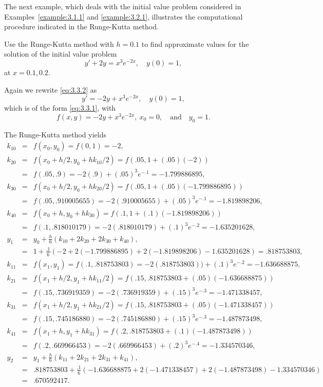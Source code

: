 \documentclass{ximera}
\begin{document}
 The next example, which deals with the initial value problem
considered in Examples~\ref{example:3.1.1} and \ref{example:3.2.1},
illustrates
the computational procedure indicated in the Runge-Kutta method.

\begin{example}\label{example:3.3.1}
Use the Runge-Kutta method with $h=0.1$ to find approximate values for
the solution of the initial value problem
\begin{equation}\label{eq:3.3.2}
y'+2y=x^3e^{-2x},\quad y(0)=1,
\end{equation}
at $x=0.1,0.2$.


\begin{explanation}
Again we rewrite \eqref{eq:3.3.2}  as
$$
y'=-2y+x^3e^{-2x},\quad y(0)=1,
$$
which is of the form \eqref{eq:3.3.1}, with
$$
f(x,y)=-2y+x^3e^{-2x},\ x_0=0,\quad\mbox{and}\quad y_0=1.
$$

The Runge-Kutta method yields
\begin{eqnarray*}
k_{10} & = & f(x_0,y_0)
  = f(0,1)=-2,\\
k_{20} & = & f(x_0+h/2,y_0+hk_{10}/2)=f(.05,1+(.05)(-2))\\
 &=& f(.05,.9)=-2(.9)+(.05)^3e^{-.1}=-1.799886895,\\
k_{30} & = & f(x_0+h/2,y_0+hk_{20}/2)=f(.05,1+(.05)(-1.799886895))\\
 &=& f(.05,.910005655)=-2(.910005655)+(.05)^3e^{-.1}=-1.819898206,\\
k_{40} & = & f(x_0+h,y_0+hk_{30})=f(.1,1+(.1)(-1.819898206))\\
&=&f(.1,.818010179)=-2(.818010179)+(.1)^3e^{-.2}=-1.635201628,\\
y_1&=&y_0+\frac{h}{6}(k_{10}+2k_{20}+2k_{30}+k_{40}),\\
&=&1+\frac{.1}{6}(-2+2(-1.799886895)+2(-1.819898206)
-1.635201628)=.818753803,\\
k_{11} & = & f(x_1,y_1)
  = f(.1,.818753803)=-2(.818753803))+(.1)^3e^{-.2}=-1.636688875,\\
k_{21} & = & f(x_1+h/2,y_1+hk_{11}/2)=f(.15,.818753803+(.05)(-1.636688875))\\
 &=& f(.15,.736919359)=-2(.736919359)+(.15)^3e^{-.3}=-1.471338457,\\
k_{31} & = & f(x_1+h/2,y_1+hk_{21}/2)=f(.15,.818753803+(.05)(-1.471338457))\\
 &=& f(.15,.745186880)=-2(.745186880)+(.15)^3e^{-.3}=-1.487873498,\\
k_{41} & = &
f(x_1+h,y_1+hk_{31})=f(.2,.818753803+(.1)(-1.487873498))\\
&=&f(.2,.669966453)=-2(.669966453)+(.2)^3e^{-.4}=-1.334570346,\\
y_2&=&y_1+\frac{h}{6}(k_{11}+2k_{21}+2k_{31}+k_{41}),\\
&=&.818753803+\frac{.1}{6}(-1.636688875+2(-1.471338457)+2(-1.487873498)-1.334570346)
\\&=&.670592417.
\end{eqnarray*}

\end{explanation}
\end{example}
\end{document}
